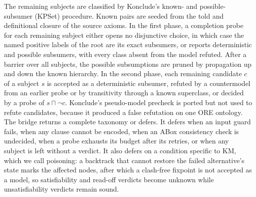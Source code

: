 The remaining subjects are classified by Konclude's known- and
possible-subsumer (KPSet) procedure.  Known pairs are seeded from the told and
definitional closure of the source axioms.  In the first phase, a completion
probe for each remaining subject either opens no disjunctive choice, in which
case the named positive labels of the root are its exact subsumers, or
reports deterministic and possible subsumers, with every class absent from the
model refuted.  After a barrier over all subjects, the possible subsumptions
are pruned by propagation up and down the known hierarchy.  In the second
phase, each remaining candidate $c$ of a subject $s$ is accepted as a
deterministic subsumer, refuted by a countermodel from an earlier probe or by
transitivity through a known superclass, or decided by a probe of
$s\sqcap\neg c$.  Konclude's pseudo-model precheck is ported but not used to
refute candidates, because it produced a false refutation on one ORE ontology.
The bridge returns a complete taxonomy or defers.  It defers when an input
guard fails, when any clause cannot be encoded, when an ABox consistency
check is undecided, when a probe exhausts its budget after its retries, or
when any subject is left without a verdict.  It also defers on a condition
specific to KM, which we call poisoning: a backtrack that cannot restore the
failed alternative's state marks the affected nodes, after which a clash-free
fixpoint is not accepted as a model, so satisfiability and read-off verdicts
become unknown while unsatisfiability verdicts remain sound.

